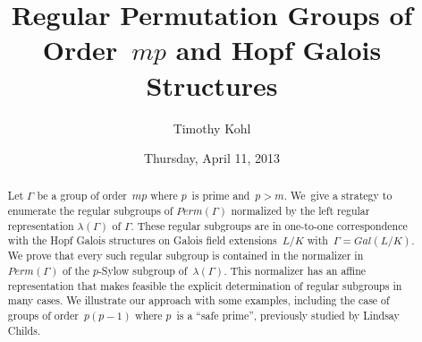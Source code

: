 \documentclass{UAmathtalk}
\author{Timothy Kohl}
\title{Regular Permutation Groups of Order~$mp$ and Hopf Galois Structures}
\date{Thursday, April 11, 2013}
\begin{document}
\maketitle

\begin{abstract}
Let $\Gamma$ be a group of order~$mp$ where $p$~is prime and~$p > m$.  We~give a strategy to enumerate the regular subgroups of $Perm(\Gamma)$ normalized by the left regular representation $\lambda(\Gamma)$ of $\Gamma$.  These regular subgroups are in one-to-one correspondence with the Hopf Galois structures on Galois field extensions~$L/K$ with~$\Gamma = Gal(L/K)$.  We prove that every such regular subgroup is contained in the normalizer in $Perm(\Gamma)$ of the $p$-Sylow subgroup of~$\lambda(\Gamma)$.  This normalizer has an affine representation that makes feasible the explicit determination of regular subgroups in many cases.  We illustrate our approach with some examples, including the case of groups of order~$p(p-1)$ where $p$~is a ``safe prime'', previously studied by Lindsay Childs.
\end{abstract}
\end{document}
